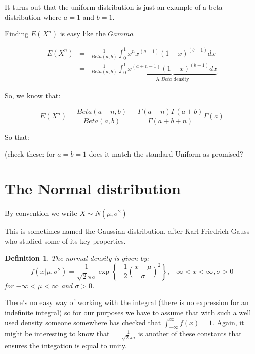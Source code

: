 \documentclass[12pt]{extbook}
\newtheorem{df}{Definition}[section]
\begin{document}
It turns out that the uniform distribution is just an example of a beta distribution where $a=1$ and $b=1$.




Finding $E(X^n)$ is easy like the $Gamma$

\begin{eqnarray*}
E(X^n) &=& \frac{1}{Beta(a,b)} \int_{0}^1 x^n x^{(a-1)}(1-x)^{(b-1)}dx \\
&=&  \frac{1}{Beta(a,b)} \int_{0}^1 \underbrace{x^{(a+n-1)}(1-x)^{(b-1)}dx}_{\mbox{A } Beta \mbox{ density}} 
\end{eqnarray*}

So, we know that:

\begin{displaymath}
E(X^n) = \frac{Beta(a-n, b)}{Beta(a,b)} = \frac{\Gamma(a+n) \Gamma(a+b)}{\Gamma(a+b+n)}{\Gamma(a)}
\end{displaymath}

So that:




(check these: for $a=b=1$ does it match the standard Uniform as promised?




\section{The Normal distribution}

{\color{green}By convention we write $X \sim N(\mu, \sigma^2)$}

This is sometimes named the Gaussian distribution, after Karl Friedrich Gauss who studied some of its key properties.

\begin{df}
The normal density is given by:
\begin{displaymath}
f(x|\mu, \sigma^2)=\frac{1}{\sqrt 2 \pi \sigma} \exp \left\{ -\frac{1}{2} \left(\frac{x-\mu}{\sigma} \right)^2 \right\}, -\infty < x < \infty, \sigma > 0 
\end{displaymath}
for $-\infty < \mu < \infty$ and $\sigma>0$.
\end{df}

There's no easy way of working with the integral (there is no expression for an indefinite integral) so for our purposes we have to assume that with such a well used density someone somewhere has checked that $\int_{-\infty}^{\infty}f(x)=1$.  Again, it might be interesting to know that $=\frac{1}{\sqrt 2 \pi \sigma}$ is another of these constants that ensures the integation is equal to unity.
\end{document}
